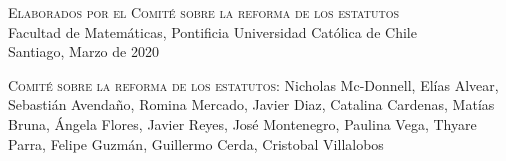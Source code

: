 \documentclass[letterpaper,11pt]{article}
\newcounter{art}
\begin{document}

\newpage
\textsc{Elaborados por el Comité sobre la reforma de los estatutos}\\
Facultad de Matemáticas, Pontificia Universidad Católica de Chile\\
Santiago, Marzo de 2020
\begin{sloppypar}
    \textsc{Comité sobre la reforma de los estatutos:} Nicholas Mc-Donnell, Elías Alvear, Sebastián Avendaño, Romina Mercado, Javier Diaz, Catalina Cardenas,  Matías Bruna, Ángela Flores, Javier Reyes, José Montenegro, Paulina Vega, Thyare Parra, Felipe Guzmán, Guillermo Cerda, Cristobal Villalobos
\end{sloppypar}
\end{document}
